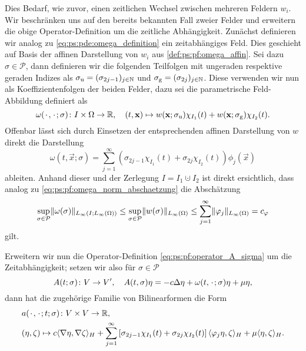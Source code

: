 Dies Bedarf, wie zuvor, einen zeitlichen Wechsel zwischen mehreren Feldern $w_{i}$.
Wir beschränken uns auf den bereits bekannten Fall zweier Felder und erweitern die obige Operator-Definition um die zeitliche Abhängigkeit.
Zunächst definieren wir analog zu \cref{eq:ps:pde:omega_definition} ein zeitabhängiges Feld.
Dies geschieht auf Basis der affinen Darstellung von $w_{i}$ aus \cref{def:ps:pf:omega_affin}.
Sei dazu $\sigma \in \mathcal P$, dann definieren wir die folgenden Teilfolgen mit ungeraden respektive geraden Indizes als $\sigma_{\text{u}} = (\sigma_{2j-1})_{j \in \mathbb{N}}$ und $\sigma_{\text{g}} = (\sigma_{2j})_{j \in \mathbb{N}}$.
Diese verwenden wir nun als Koeffizientenfolgen der beiden Felder, dazu sei die parametrische Feld-Abbildung definiert als
\begin{equation}
\label{eq:ps:pde:omega_definition_affin}
    \omega({\mkern2mu\cdot\mkern2mu}, {\mkern2mu\cdot\mkern2mu}; \sigma) \colon I \times \Omega \to \mathbb{R}, \quad (t, \mathbf{x}) \mapsto
    w(\mathbf{x}; \sigma_{\text{u}}) \chi_{I_{1}}(t) + w(\mathbf{x}; \sigma_{\text{g}}) \chi_{I_{2}}(t).
\end{equation}
Offenbar lässt sich durch Einsetzen der entsprechenden affinen Darstellung von $w$ direkt die Darstellung
\begin{equation}
    \omega(t, \vec{x}; \sigma) = \sum_{j = 1}^{\infty} (\sigma_{2j-1} \chi_{I_{1}}(t) + \sigma_{2j} \chi_{I_{2}}(t)) \phi_{j}(\vec x)
\end{equation}
ableiten.
Anhand dieser und der Zerlegung $I = I_{1} \cupdot I_{2}$ ist direkt ersichtlich, dass analog zu \cref{eq:ps:pf:omega_norm_abschaetzung} die Abschätzung
\begin{equation}
\label{eq:abschaetzung_feld_sigma_zeit}
    \sup_{\sigma \in \mathcal P} \lVert\omega(\sigma)\rVert_{L_{\infty}(I; L_{\infty}(\Omega))} \leq \sup_{\sigma \in \mathcal P} \lVert w(\sigma)\rVert_{L_{\infty}(\Omega)} \leq \sum_{j = 1}^{\infty} \lVert\varphi_{j}\rVert_{L_{\infty}(\Omega)} = c_{\varphi}
\end{equation}
gilt.

Erweitern wir nun die Operator-Definition \cref{eq:ps:pf:operator_A_sigma} um die Zeitabhängigkeit; setzen wir also für $\sigma \in \mathcal P$
\begin{equation}
    \label{eq:ps:pf:operator_A_sigma_zeit}
    A(t; \sigma) \colon V \to V', \quad A(t, \sigma) \eta = -c \Delta \eta + \omega(t, {\mkern2mu\cdot\mkern2mu}; \sigma) \eta + \mu \eta,
\end{equation}
dann hat die zugehörige Familie von Bilinearformen die Form
\begin{equation}
    \label{eq:ps:pf:bilineaform_a_sigma_zeit}
    \begin{aligned}
        &a({\mkern2mu\cdot\mkern2mu}, {\mkern2mu\cdot\mkern2mu}; t; \sigma) \colon V \times V \to \mathbb{R}, \\
        &(\eta, \zeta) \mapsto c\langle\nabla \eta,\nabla \zeta\rangle_{H} + \sum_{j = 1}^{\infty} \left[ \sigma_{2j-1} \chi_{I_{1}}(t) + \sigma_{2j} \chi_{I_{2}}(t)  \right] \langle\varphi_{j} \eta,\zeta\rangle_{H} + \mu \langle\eta,\zeta\rangle_{H}.
    \end{aligned}
\end{equation}

